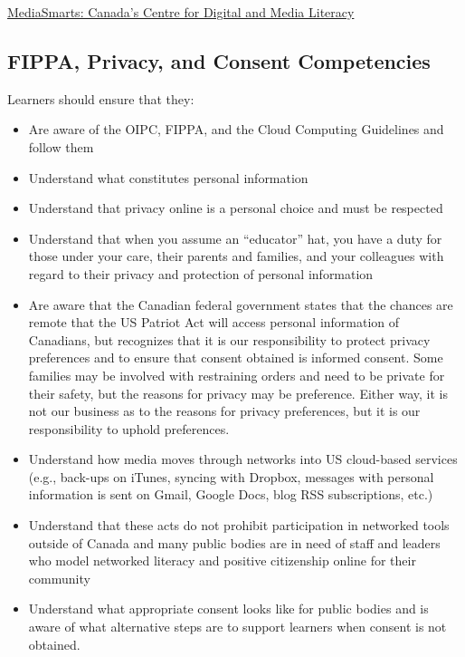 \documentclass[
]{book}
\providecommand{\tightlist}{%
  \setlength{\itemsep}{0pt}\setlength{\parskip}{0pt}}
\begin{document}
\href{http://mediasmarts.ca/}{MediaSmarts: Canada's Centre for Digital and Media Literacy}

\hypertarget{fippa-privacy-and-consent-competencies}{%
\subsection*{FIPPA, Privacy, and Consent Competencies}\label{fippa-privacy-and-consent-competencies}}

Learners should ensure that they:

\begin{itemize}
\tightlist
\item
  Are aware of the OIPC, FIPPA, and the Cloud Computing Guidelines and follow them\\
\item
  Understand what constitutes personal information\\
\item
  Understand that privacy online is a personal choice and must be respected\\
\item
  Understand that when you assume an ``educator'' hat, you have a duty for those under your care, their parents and families, and your colleagues with regard to their privacy and protection of personal information\\
\item
  Are aware that the Canadian federal government states that the chances are remote that the US Patriot Act will access personal information of Canadians, but recognizes that it is our responsibility to protect privacy preferences and to ensure that consent obtained is informed consent. Some families may be involved with restraining orders and need to be private for their safety, but the reasons for privacy may be preference. Either way, it is not our business as to the reasons for privacy preferences, but it is our responsibility to uphold preferences.\\
\item
  Understand how media moves through networks into US cloud-based services (e.g., back-ups on iTunes, syncing with Dropbox, messages with personal information is sent on Gmail, Google Docs, blog RSS subscriptions, etc.)\\
\item
  Understand that these acts do not prohibit participation in networked tools outside of Canada and many public bodies are in need of staff and leaders who model networked literacy and positive citizenship online for their community\\
\item
  Understand what appropriate consent looks like for public bodies and is aware of what alternative steps are to support learners when consent is not obtained.
\end{itemize}
\end{document}
